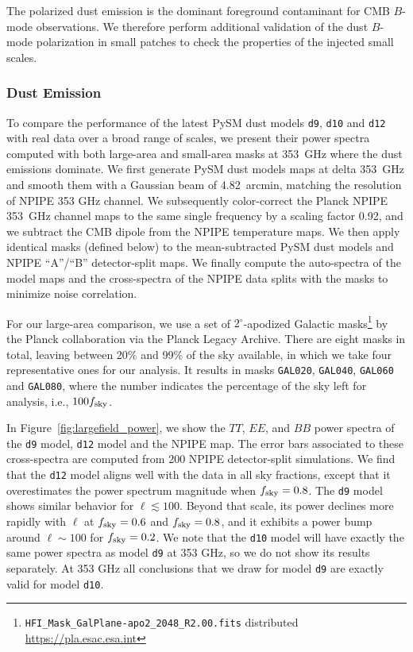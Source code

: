 \documentclass[twocolumn]{aastex631}
\begin{document}
The polarized dust emission is the dominant foreground contaminant for CMB $B$-mode observations. We therefore perform additional validation of the dust $B$-mode polarization in small patches to check the properties of the injected small scales. 

\subsubsection{Dust Emission} \label{sec:dust_validation}
To compare the performance of the latest PySM dust models \texttt{d9}, \texttt{d10} and \texttt{d12} with real data over a broad range of scales, we present their power spectra computed with both large-area and small-area masks at 353~GHz where the dust emissions dominate. We first generate PySM dust models maps at delta 353~GHz and smooth them with a Gaussian beam of 4.82~arcmin, matching the resolution of NPIPE 353 GHz channel. We subsequently color-correct the Planck NPIPE 353~GHz channel maps to the same single frequency by a scaling factor 0.92, and we subtract the CMB dipole from the NPIPE temperature maps. We then apply identical masks (defined below) to the mean-subtracted PySM dust models and NPIPE ``A''/``B'' detector-split maps. We finally compute the auto-spectra of the model maps and the cross-spectra of the NPIPE data splits with the masks to minimize noise correlation. 

For our large-area comparison, we use a set of $2^\circ$-apodized Galactic masks\footnote{\texttt{HFI\_Mask\_GalPlane-apo2\_2048\_R2.00.fits} distributed \url{https://pla.esac.esa.int}} by the Planck collaboration via the Planck Legacy Archive. There are eight masks in total, leaving between 20\% and 99\% of the sky available, in which we take four representative ones for our analysis. It results in masks \texttt{GAL020}, \texttt{GAL040}, \texttt{GAL060} and \texttt{GAL080}, where the number indicates the percentage of the sky left for analysis, i.e., $100 f_{\rm sky}$. 

In Figure~\ref{fig:largefield_power}, we show the $TT$, $EE$, and $BB$ power spectra of the \texttt{d9} model, \texttt{d12} model and the NPIPE map. The error bars associated to these cross-spectra are computed from 200 NPIPE detector-split simulations. We find that the \texttt{d12} model aligns well with the data in all sky fractions, except that it overestimates the power spectrum magnitude when $f_{\rm sky} = 0.8$. The \texttt{d9} model shows similar behavior for $\ell \lesssim 100$. Beyond that scale, its power declines more rapidly with $\ell$ at $f_{\rm sky} = 0.6$ and $f_{\rm sky} = 0.8$, and it exhibits a power bump around $\ell \sim 100$ for $f_{\rm sky} = 0.2$. We note that the \texttt{d10} model will have exactly the same power spectra as model \texttt{d9} at 353 GHz, so we do not show its results separately. At 353 GHz all conclusions that we draw for model \texttt{d9} are exactly valid for model \texttt{d10}.
\end{document}
